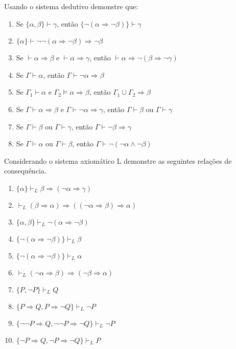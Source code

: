 \begin{exercise}\label{exerc:LPro3}
    Usando o sistema dedutivo demonstre que:
\end{exercise}

\begin{enumerate}
    \item Se $\{\alpha, \beta\} \vdash \gamma$, então $\{\neg(\alpha \Rightarrow \neg \beta)\} \vdash \gamma$
    \item $\{\alpha\} \vdash \neg \neg (\alpha \Rightarrow \neg \beta) \Rightarrow \neg \beta$
    \item Se $\vdash \alpha \Rightarrow \beta$ e $\vdash \alpha \Rightarrow \gamma$, então $\vdash \alpha \Rightarrow \neg (\beta \Rightarrow \neg \gamma)$
    \item Se $\Gamma \vdash \alpha$, então $\Gamma \vdash \neg \alpha \Rightarrow \beta$
    \item Se $\Gamma_1 \vdash \alpha$ e $\Gamma_2 \vDash \alpha \Rightarrow \beta$, então $\Gamma_1 \cup \Gamma_2 \Rightarrow \beta$
    \item Se $\Gamma \vdash \alpha \Rightarrow \beta$ e $\Gamma \vdash \neg \alpha \Rightarrow \gamma$, então $\Gamma \vdash \beta$ ou $\Gamma \vdash \gamma$
    \item Se $\Gamma \vdash \beta$ ou $\Gamma \vdash \gamma$, então $\Gamma \vdash \neg \beta \Rightarrow \gamma$
    \item Se $\Gamma \vdash \alpha$ ou $\Gamma \vdash \beta$, então $\Gamma \vdash \neg (\neg \alpha \land \neg \beta)$
\end{enumerate}

\begin{exercise}\label{exerc:LPro4}
    Considerando o sistema axiomático L demonstre as seguintes relações de consequência.
\end{exercise}

\begin{enumerate}
    \item $\{\alpha\} \vdash_L \beta \Rightarrow (\neg \alpha \Rightarrow \gamma)$
    \item $\vdash_L (\beta \Rightarrow \alpha) \Rightarrow ((\neg \alpha \Rightarrow \beta) \Rightarrow \alpha)$
    \item $\{\alpha, \beta\} \vdash_L \neg (\alpha \Rightarrow \neg \beta)$
    \item $\{\neg (\alpha \Rightarrow \neg \beta)\} \vdash_L \beta$
    \item $\{\neg (\alpha \Rightarrow \neg \beta)\} \vdash_L \alpha$
    \item $\vdash_L (\neg \alpha \Rightarrow \beta) \Rightarrow (\neg \beta \Rightarrow \alpha)$
    \item $\{P, \neg P\} \vdash_L Q$
    \item $\{P \Rightarrow Q, P \Rightarrow \neg Q\} \vdash_L \neg P$
    \item $\{\neg \neg P \Rightarrow Q, \neg \neg P \Rightarrow \neg Q\} \vdash_L \neg P$
    \item $\{\neg P \Rightarrow Q, \neg P \Rightarrow \neg Q\} \vdash_L P$
\end{enumerate}

